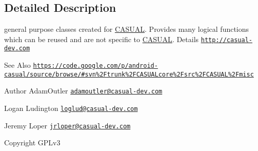 \subsection{Detailed Description}
general purpose classes created for \hyperlink{namespaceCASUAL}{C\-A\-S\-U\-A\-L}. Provides many logical functions which can be reused and are not specific to \hyperlink{namespaceCASUAL}{C\-A\-S\-U\-A\-L}. Details \href{http://casual-dev.com}{\tt http\-://casual-\/dev.\-com} \begin{DoxySeeAlso}{See Also}
\href{https://code.google.com/p/android-casual/source/browse/#svn%2Ftrunk%2FCASUALcore%2Fsrc%2FCASUAL%2Fmisc}{\tt https\-://code.\-google.\-com/p/android-\/casual/source/browse/\#svn\%2\-Ftrunk\%2\-F\-C\-A\-S\-U\-A\-Lcore\%2\-Fsrc\%2\-F\-C\-A\-S\-U\-A\-L\%2\-Fmisc} 
\end{DoxySeeAlso}
\begin{DoxyAuthor}{Author}
Adam\-Outler \href{mailto:adamoutler@casual-dev.com}{\tt adamoutler@casual-\/dev.\-com} 

Logan Ludington \href{mailto:loglud@casual-dev.com}{\tt loglud@casual-\/dev.\-com} 

Jeremy Loper \href{mailto:jrloper@casual-dev.com}{\tt jrloper@casual-\/dev.\-com} 
\end{DoxyAuthor}
\begin{DoxyCopyright}{Copyright}
G\-P\-Lv3 
\end{DoxyCopyright}

